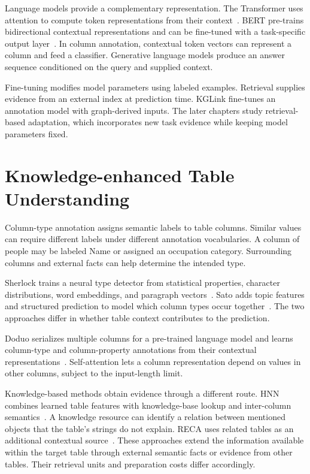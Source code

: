 Language models provide a complementary representation. The Transformer uses attention to compute token representations from their context~\cite{bg-transformer}. BERT pre-trains bidirectional contextual representations and can be fine-tuned with a task-specific output layer~\cite{bg-bert}. In column annotation, contextual token vectors can represent a column and feed a classifier. Generative language models produce an answer sequence conditioned on the query and supplied context.

Fine-tuning modifies model parameters using labeled examples. Retrieval supplies evidence from an external index at prediction time. KGLink fine-tunes an annotation model with graph-derived inputs. The later chapters study retrieval-based adaptation, which incorporates new task evidence while keeping model parameters fixed.

\section{Knowledge-enhanced Table Understanding}
\label{sec:background:tables}

Column-type annotation assigns semantic labels to table columns. Similar values can require different labels under different annotation vocabularies. A column of people may be labeled Name or assigned an occupation category. Surrounding columns and external facts can help determine the intended type.

Sherlock trains a neural type detector from statistical properties, character distributions, word embeddings, and paragraph vectors~\cite{bg-sherlock}. Sato adds topic features and structured prediction to model which column types occur together~\cite{bg-sato}. The two approaches differ in whether table context contributes to the prediction.

Doduo serializes multiple columns for a pre-trained language model and learns column-type and column-property annotations from their contextual representations~\cite{bg-doduo}. Self-attention lets a column representation depend on values in other columns, subject to the input-length limit.

Knowledge-based methods obtain evidence through a different route. HNN combines learned table features with knowledge-base lookup and inter-column semantics~\cite{bg-hnn}. A knowledge resource can identify a relation between mentioned objects that the table's strings do not explain. RECA uses related tables as an additional contextual source~\cite{bg-reca}. These approaches extend the information available within the target table through external semantic facts or evidence from other tables. Their retrieval units and preparation costs differ accordingly.

